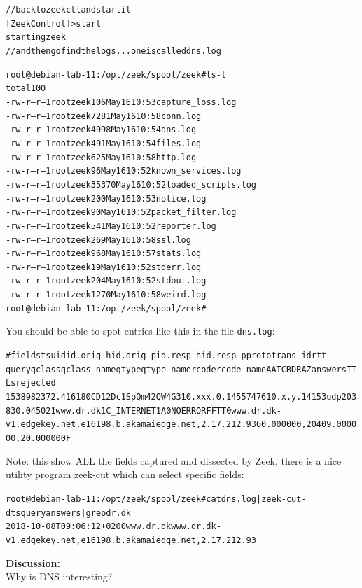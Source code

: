 \documentclass[a4paper,11pt,notitlepage]{report}
\begin{document}
\begin{alltt}\small
// back to zeekctl and start it
[ZeekControl] > start
starting zeek
// and then go find the logs ... one is called dns.log

root@debian-lab-11:/opt/zeek/spool/zeek# ls -l
total 100
-rw-r--r-- 1 root zeek   106 May 16 10:53 capture_loss.log
-rw-r--r-- 1 root zeek  7281 May 16 10:58 conn.log
-rw-r--r-- 1 root zeek  4998 May 16 10:54 dns.log
-rw-r--r-- 1 root zeek   491 May 16 10:54 files.log
-rw-r--r-- 1 root zeek   625 May 16 10:58 http.log
-rw-r--r-- 1 root zeek    96 May 16 10:52 known_services.log
-rw-r--r-- 1 root zeek 35370 May 16 10:52 loaded_scripts.log
-rw-r--r-- 1 root zeek   200 May 16 10:53 notice.log
-rw-r--r-- 1 root zeek    90 May 16 10:52 packet_filter.log
-rw-r--r-- 1 root zeek   541 May 16 10:52 reporter.log
-rw-r--r-- 1 root zeek   269 May 16 10:58 ssl.log
-rw-r--r-- 1 root zeek   968 May 16 10:57 stats.log
-rw-r--r-- 1 root zeek    19 May 16 10:52 stderr.log
-rw-r--r-- 1 root zeek   204 May 16 10:52 stdout.log
-rw-r--r-- 1 root zeek  1270 May 16 10:58 weird.log
root@debian-lab-11:/opt/zeek/spool/zeek#
\end{alltt}

You should be able to spot entries like this in the file \verb+dns.log+:
\begin{alltt}\small
#fields ts      uid     id.orig_h       id.orig_p       id.resp_h       id.resp_p       proto   trans_id        rtt
     query   qclass  qclass_name     qtype   qtype_name      rcode   rcode_name      AA      TC      RD      RA      Z       answers TTLs    rejected
1538982372.416180	CD12Dc1SpQm42QW4G3	10.xxx.0.145	57476	10.x.y.141	53	udp	20383	0.045021	www.dr.dk	1	C_INTERNET	1	A	0	NOERROR	F	F	T	T	0	www.dr.dk-v1.edgekey.net,e16198.b.akamaiedge.net,2.17.212.93	60.000000,20409.000000,20.000000	F
\end{alltt}

Note: this show ALL the fields captured and dissected by Zeek, there is a nice utility program zeek-cut which can select specific fields:

\begin{alltt}\small
root@debian-lab-11:/opt/zeek/spool/zeek# cat dns.log | zeek-cut -d ts query answers | grep dr.dk
2018-10-08T09:06:12+0200	www.dr.dk	www.dr.dk-v1.edgekey.net,e16198.b.akamaiedge.net,2.17.212.93
\end{alltt}

{\bf Discussion:}\\
Why is DNS interesting?
\end{document}
